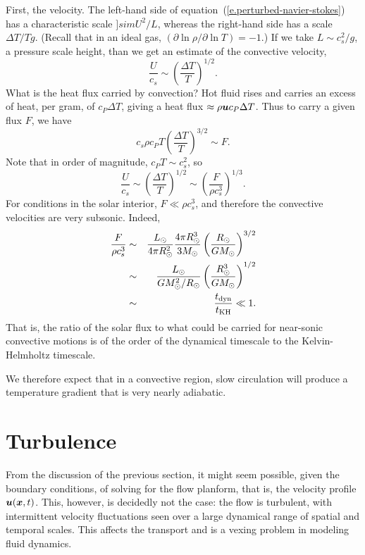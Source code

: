First, the velocity.  The left-hand side of equation~(\ref{e.perturbed-navier-stokes}) has a characteristic scale $]sim U^{2}/L$, whereas the right-hand side has a scale $\Delta T/T g$. (Recall that in an ideal gas, $(\partial\ln \rho/\partial\ln T) = -1$.)  If we take $L \sim c_{s}^{2}/g$, a pressure scale height, than we get an estimate of the convective velocity,
\begin{equation}\label{e.convective-velocity-estimate}
\frac{U}{c_{s}} \sim \left(\frac{\Delta T}{T}\right)^{1/2}.
\end{equation}
What is the heat flux carried by convection? Hot fluid rises and carries an excess of heat, per gram, of $c_{P}\Delta T$, giving a heat flux $\approx \rho \boldsymbol{u} c_{P}\Delta T$. Thus to carry a given flux $F$, we have
\begin{equation}\label{e.convective-flux-estimate}
c_{s}\rho c_{P} T\left(\frac{\Delta T}{T}\right)^{3/2} \sim F.
\end{equation}
Note that in order of magnitude, $c_{P}T \sim c_{s}^{2}$, so 
\[
\frac{U}{c_{s}} \sim \left(\frac{\Delta T}{T}\right)^{1/2} \sim \left(\frac{F}{\rho c_{s}^{3}}\right)^{1/3}.
\]
For conditions in the solar interior, $F \ll \rho c_{s}^{3}$, and therefore the convective velocities are very subsonic. Indeed,
\begin{eqnarray*}
 \frac{F}{\rho c_{s}^{3}} &\sim& \frac{L_{\odot}}{4\pi R_{\odot}^{2}}\frac{4\pi R_{\odot}^{3}}{3M_\odot}\left(\frac{R_{\odot}}{GM_\odot}\right)^{3/2}\\
  &\sim& \frac{L_{\odot}}{GM_\odot^{2}/R_{\odot}}\left(\frac{R_{\odot}^{3}}{GM_\odot}\right)^{1/2} \\
 	&\sim& \frac{t_{\mathrm{dyn}}}{t_{\mathrm{KH}}} \ll 1.
\end{eqnarray*}
That is, the ratio of the solar flux to what could be carried for near-sonic convective motions is of the order of the dynamical timescale to the Kelvin-Helmholtz timescale.

We therefore expect that in a convective region, slow circulation will produce a temperature gradient that is very nearly adiabatic.

\section{Turbulence}
 
From the discussion of the previous section, it might seem possible, given the boundary conditions, of solving for the flow planform, that is, the velocity profile $\boldsymbol{u}(\boldsymbol{x},t)$. This, however, is decidedly not the case: the flow is turbulent, with intermittent velocity fluctuations seen over a large dynamical range of spatial and temporal scales.  This affects the transport and is a vexing problem in modeling fluid dynamics.

